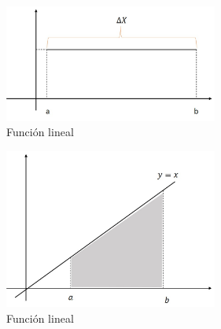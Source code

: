 \documentclass[10pt,twoside]{SelfArx} %
\begin{document}
 

\begin{figure}[h]
	\centering
	\includegraphics[width=7cm]{integracion5}
	\caption{Función lineal}
	\label{integracion5}
\end{figure}

    \begin{figure}[h]
    	\centering
    	\includegraphics[width=7cm]{integracion4}
    	\caption{Función lineal}
    	\label{integracion4}
    \end{figure}
\end{document}
